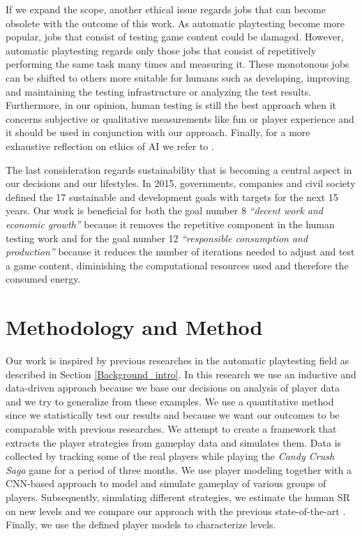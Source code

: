 If we expand the scope, another ethical issue regards jobs that can become obsolete with the outcome of this work. As automatic playtesting become more popular, jobs that consist of testing game content could be damaged. However, automatic playtesting regards only those jobs that consist of repetitively performing the same task many times and measuring it. These monotonous jobs can be shifted to others more suitable for humans such as developing, improving and maintaining the testing infrastructure or analyzing the test results. Furthermore, in our opinion, human testing is still the best approach when it concerns subjective or qualitative measurements like fun or player experience and it should be used in conjunction with our approach. Finally, for a more exhaustive reflection on ethics of \acs{AI} we refer to \textcite{bostrom_ethics_2014}.

The last consideration regards sustainability that is becoming a central aspect in our decisions and  our lifestyles. In 2015, governments, companies and civil society defined the 17 sustainable and development goals with targets for the next 15 years. Our work is beneficial for both the goal number 8 \textit{“decent work and economic growth”} because it removes the repetitive component in the human testing work and for the goal number 12 \textit{“responsible consumption and production”} because it reduces the number of iterations needed to adjust and test a game content, diminishing the computational resources used and therefore the consumed energy.

\section{Methodology and Method}
Our work is inspired by previous researches in the automatic playtesting field as described in Section \ref{Background_intro}. In this research we use an inductive \cite{kumar_selecting_2011} and data-driven approach because we base our decisions on analysis of player data and we try to generalize from these examples. We use a quantitative method \cite{creswell_research_2018} since we statistically test our results and because we want our outcomes to be comparable with previous researches. We attempt to create a framework that extracts the player strategies from gameplay data and simulates them. Data is collected by tracking some of the real players while playing the \textit{Candy Crush Saga} game for a period of three months. We use player modeling together with a \acs{CNN}-based approach to model and simulate gameplay of various groups of players. Subsequently, simulating different strategies, we estimate the human SR on new levels and we compare our approach with the previous state-of-the-art \cite{eisen_simulating_2017}. Finally, we use the defined player models to characterize levels. 

